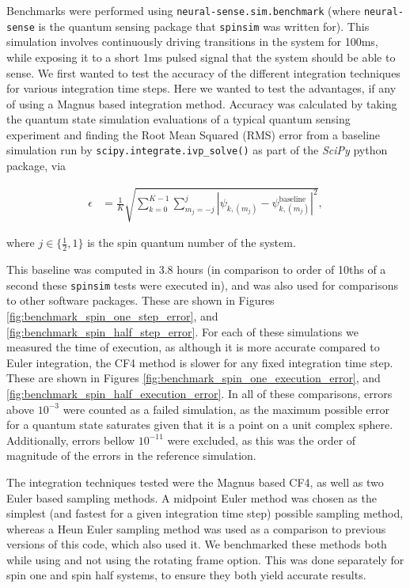 \documentclass{jors}
\begin{document}
		Benchmarks were performed using \texttt{neural-sense.sim.benchmark} (where \texttt{neural-sense} \cite{alexander-tritt-monash_alexander-tritt-monashneural-sense_2020} is the quantum sensing package that \texttt{spinsim} was written for). This simulation involves continuously driving transitions in the system for 100ms, while exposing it to a short 1ms pulsed signal that the system should be able to sense. We first wanted to test the accuracy of the different integration techniques for various integration time steps. Here we wanted to test the advantages, if any of using a Magnus based integration method. Accuracy was calculated by taking the quantum state simulation evaluations of a typical quantum sensing experiment and finding the Root Mean Squared (RMS) error from a baseline simulation run by \texttt{scipy.integrate.ivp\_solve()} as part of the \emph{SciPy} python package, via

			\begin{align}
                \epsilon &= \frac{1}{K}\sqrt{\sum_{k = 0}^{K - 1}\sum_{m_j = -j}^j|\psi_{k, (m_j)} - \psi_{k, (m_j)}^{\textrm{baseline}}|^2},\label{eq:error}
            \end{align}

			where \(j \in \{\frac12, 1\}\) is the spin quantum number of the system.

			This baseline was computed in 3.8 hours (in comparison to order of 10ths of a second these \texttt{spinsim} tests were executed in), and was also used for comparisons to other software packages. These are shown in Figures \ref{fig:benchmark_spin_one_step_error}, and \ref{fig:benchmark_spin_half_step_error}. For each of these simulations we measured the time of execution, as although it is more accurate compared to Euler integration, the CF4 method is slower for any fixed integration time step. These are shown in Figures \ref{fig:benchmark_spin_one_execution_error}, and \ref{fig:benchmark_spin_half_execution_error}. In all of these comparisons, errors above \(10^{-3}\) were counted as a failed simulation, as the maximum possible error for a quantum state saturates given that it is a point on a unit complex sphere. Additionally, errors bellow \(10^{-11}\) were excluded, as this was the order of magnitude of the errors in the reference simulation.

			The integration techniques tested were the Magnus based CF4, as well as two Euler based sampling methods. A midpoint Euler method was chosen as the simplest (and fastest for a given integration time step)  possible sampling method, whereas a Heun Euler sampling method was used as a comparison to previous versions of this code, which also used it. We benchmarked these methods both while using and not using the rotating frame option. This was done separately for spin one and spin half systems, to ensure they both yield accurate results.
\end{document}
